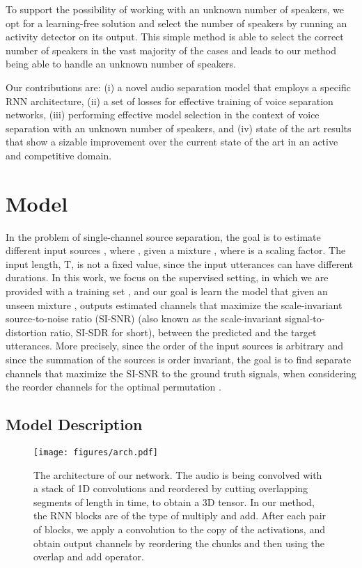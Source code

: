 \documentclass{article}
\begin{document}
To support the possibility of working with an unknown number of speakers, we opt for a learning-free solution and select the number of speakers by running an activity detector on its output. This simple method is able to select the correct number of speakers in the vast majority of the cases and leads to our method being able to handle an unknown number of speakers.

Our contributions are: (i) a novel audio separation model that employs a specific RNN architecture, (ii) a set of losses for effective training of voice separation networks, (iii) performing effective model selection in the context of voice separation with an unknown number of speakers, and (iv) state of the art results that show a sizable improvement over the current state of the art in an active and competitive domain.
 \section{Model}
In the problem of single-channel source separation, the goal is to estimate  different input sources , where , given a mixture , where  is a scaling factor. The input length, T, is not a fixed value, since the input utterances can have different durations. In this work, we focus on the supervised setting, in which we are provided with a training set , and our goal is learn the model that given an unseen mixture , outputs  estimated channels  that maximize the scale-invariant source-to-noise ratio (SI-SNR) (also known as the scale-invariant signal-to-distortion ratio, SI-SDR for short), between the predicted and the target utterances. More precisely, since the order of the input sources is arbitrary and since the summation of the sources is order invariant, the goal is to find  separate channels  that maximize the SI-SNR to the ground truth signals, when considering the reorder channels  for the optimal permutation .

\subsection{Model Description}

\begin{figure*}[t]
   \centering
   \texttt{[image: figures/arch.pdf]}
    \caption{The architecture of our network. The audio is being convolved with a stack of 1D convolutions and reordered by cutting overlapping segments of length  in time, to obtain a 3D tensor. 
In our method, the RNN blocks are of the type of multiply and add. After each pair of blocks, we apply a convolution  to the copy of the activations, and obtain output channels by reordering the chunks and then using the overlap and add operator.}
 \label{fig:arch}
\end{figure*}
\end{document}
